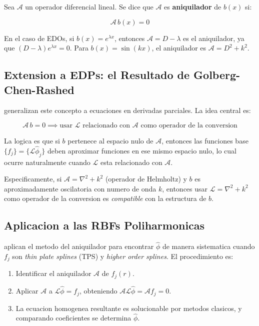 \documentclass[12pt,a4paper]{article}
\begin{document}
Sea $\mathcal{A}$ un operador diferencial lineal. Se dice que $\mathcal{A}$ es
\textbf{aniquilador} de $b(x)$ si:

\begin{equation}
    \mathcal{A}\, b(x) = 0
\end{equation}

En el caso de EDOs, si $b(x) = e^{\lambda x}$, entonces $\mathcal{A} = D - \lambda$
es el aniquilador, ya que $(D - \lambda)e^{\lambda x} = 0$. Para
$b(x) = \sin(kx)$, el aniquilador es $\mathcal{A} = D^2 + k^2$.

\subsection{Extension a EDPs: el Resultado de Golberg-Chen-Rashed}

\cite{golberg1999annihilator} generalizan este concepto a ecuaciones en derivadas
parciales. La idea central es:

\begin{equation}
    \mathcal{A}\, b = 0 \implies
    \text{usar } \mathcal{L} \text{ relacionado con } \mathcal{A}
    \text{ como operador de la conversion}
\end{equation}

La logica es que si $b$ pertenece al espacio nulo de $\mathcal{A}$, entonces
las funciones base $\{f_j\} = \{\mathcal{L}\hat{\phi}_j\}$ deben aproximar
funciones en ese mismo espacio nulo, lo cual ocurre naturalmente cuando
$\mathcal{L}$ esta relacionado con $\mathcal{A}$.

Especificamente, si $\mathcal{A} = \nabla^2 + k^2$ (operador de Helmholtz) y
$b$ es aproximadamente oscilatoria con numero de onda $k$, entonces usar
$\mathcal{L} = \nabla^2 + k^2$ como operador de la conversion es
\emph{compatible} con la estructura de $b$.

\subsection{Aplicacion a las RBFs Poliharmonicas}

\cite{golberg1999annihilator} aplican el metodo del aniquilador para encontrar
$\hat{\phi}$ de manera sistematica cuando $f_j$ son \emph{thin plate splines}
(TPS) y \emph{higher order splines}. El procedimiento es:

\begin{enumerate}
    \item Identificar el aniquilador $\mathcal{A}$ de $f_j(r)$.
    \item Aplicar $\mathcal{A}$ a $\mathcal{L}\hat{\phi} = f_j$, obteniendo
    $\mathcal{A}\mathcal{L}\hat{\phi} = \mathcal{A}f_j = 0$.
    \item La ecuacion homogenea resultante es solucionable por metodos clasicos,
    y comparando coeficientes se determina $\hat{\phi}$.
\end{enumerate}
\end{document}
